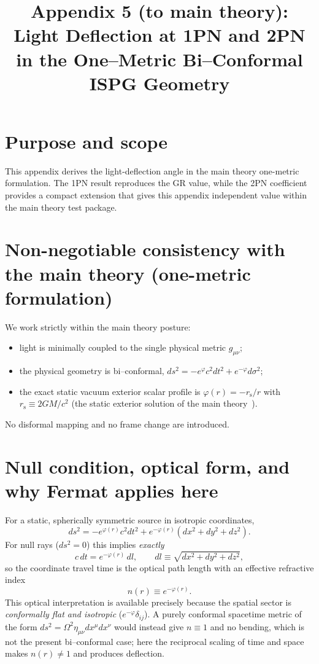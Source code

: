 \documentclass[11pt]{article}
\title{Appendix 5 (to main theory): Light Deflection at 1PN and 2PN in the One--Metric Bi--Conformal ISPG Geometry}
\author{}
\date{}
\newcommand{\rs}{r_{\mathrm{s}}}
\begin{document}
\let\phi\varphi
\maketitle

\section*{Purpose and scope}
This appendix derives the light-deflection angle in the main theory one-metric formulation. The 1PN result reproduces the GR value, while the 2PN coefficient provides a compact extension that gives this appendix independent value within the main theory test package.

\section*{Non-negotiable consistency with the main theory (one-metric formulation)}
We work strictly within the main theory posture:
\begin{itemize}
\item light is minimally coupled to the single physical metric $g_{\mu\nu}$;
\item the physical geometry is bi--conformal, $ds^2=-e^{\phi}c^2dt^2+e^{-\phi}d\sigma^2$;
\item the exact static vacuum exterior scalar profile is $\phi(r)=-\rs/r$ with $\rs\equiv 2GM/c^2$ (the static exterior solution of the main theory~\cite{Lotishvili2026}).
\end{itemize}
No disformal mapping and no frame change are introduced.

\section{Null condition, optical form, and why Fermat applies here}\label{sec:fermat}
For a static, spherically symmetric source in isotropic coordinates,
\begin{equation}
ds^2=-e^{\phi(r)}c^2dt^2+e^{-\phi(r)}\left(dx^2+dy^2+dz^2\right).
\label{eq:biconf_app5}
\end{equation}
For null rays ($ds^2=0$) this implies \emph{exactly}
\begin{equation}
c\,dt = e^{-\phi(r)}\,dl,\qquad dl\equiv \sqrt{dx^2+dy^2+dz^2},
\label{eq:dt_app5}
\end{equation}
so the coordinate travel time is the optical path length with an effective refractive index
\begin{equation}
n(r)\equiv e^{-\phi(r)}.
\label{eq:n}
\end{equation}
This optical interpretation is available precisely because the spatial sector is \emph{conformally flat and isotropic} ($e^{-\phi}\delta_{ij}$). A purely conformal spacetime metric of the form $ds^2=\Omega^2\eta_{\mu\nu}dx^\mu dx^\nu$ would instead give $n\equiv 1$ and no bending, which is not the present bi--conformal case; here the reciprocal scaling of time and space makes $n(r)\neq 1$ and produces deflection.
\end{document}
